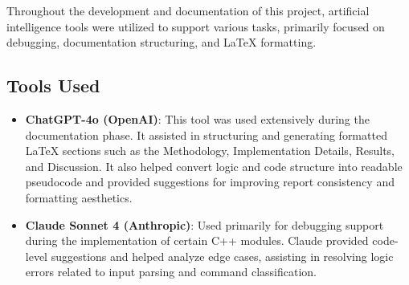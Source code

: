 \documentclass{article}
\begin{document}
Throughout the development and documentation of this project, artificial intelligence tools were utilized to support various tasks, primarily focused on debugging, documentation structuring, and LaTeX formatting.

\subsection*{Tools Used}

\begin{itemize}
    \item \textbf{ChatGPT-4o (OpenAI)}: This tool was used extensively during the documentation phase. It assisted in structuring and generating formatted LaTeX sections such as the Methodology, Implementation Details, Results, and Discussion. It also helped convert logic and code structure into readable pseudocode and provided suggestions for improving report consistency and formatting aesthetics.

    \item \textbf{Claude Sonnet 4 (Anthropic)}: Used primarily for debugging support during the implementation of certain C++ modules. Claude provided code-level suggestions and helped analyze edge cases, assisting in resolving logic errors related to input parsing and command classification.
\end{itemize}
\end{document}
